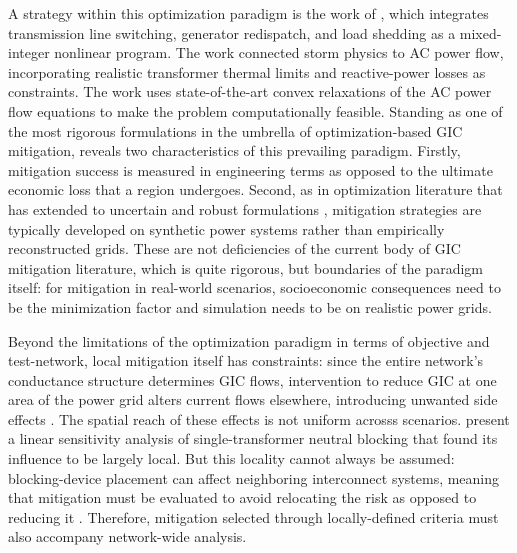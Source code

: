 \documentclass[draft]{agujournal2019}
\begin{document}
A strategy within this optimization paradigm is the work of , which integrates transmission line switching, generator redispatch, and load shedding as a mixed-integer nonlinear program. The work connected storm physics to AC power flow, incorporating realistic transformer thermal limits and reactive-power losses as constraints. The work uses state-of-the-art convex relaxations of the AC power flow equations to make the problem computationally feasible. Standing as one of the most rigorous formulations in the umbrella of optimization-based GIC mitigation,  reveals two characteristics of this prevailing paradigm. Firstly, mitigation success is measured in engineering terms as opposed to the ultimate economic loss that a region undergoes. Second, as in optimization literature that has extended to uncertain and robust formulations \cite{Lu2018, Ryu2022}, mitigation strategies are typically developed on synthetic power systems rather than empirically reconstructed grids. These are not deficiencies of the current body of GIC mitigation literature, which is quite rigorous, but boundaries of the paradigm itself: for mitigation in real-world scenarios, socioeconomic consequences need to be the minimization factor and simulation needs to be on realistic power grids.

Beyond the limitations of the optimization paradigm in terms of objective and test-network, local mitigation itself has constraints: since the entire network's conductance structure determines GIC flows, intervention to reduce GIC at one area of the power grid alters current flows elsewhere, introducing unwanted side effects \cite{Schachinger2023}. The spatial reach of these effects is not uniform acrosss scenarios.  present a linear sensitivity analysis of single-transformer neutral blocking that found its influence to be largely local. But this locality cannot always be assumed: blocking-device placement can affect neighboring interconnect systems, meaning that mitigation must be evaluated to avoid relocating the risk as opposed to reducing it \cite{Liang2019}. Therefore, mitigation selected through locally-defined criteria must also accompany network-wide analysis.
\end{document}
